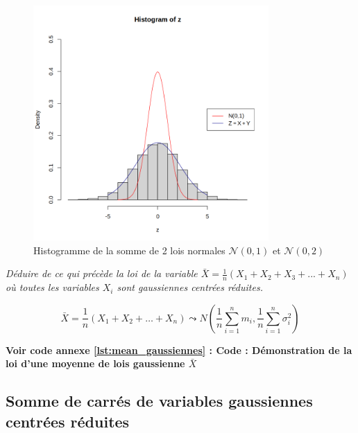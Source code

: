 \begin{table}[H]
\begin{minipage}{0.28\textwidth}
        \end{minipage}
        \hfill
        \begin{minipage}{0.28\textwidth}
            \centering
            \begin{figure}[H]
                \centering
                \includegraphics[width=0.80\textwidth]{4_attachments/figures/output33.png}
                \caption{Histogramme de la somme de 2 lois normales $\mathcal N(0,1)$ et $\mathcal N(0,2)$}
                \label{fig:fig3}
            \end{figure}
            
        \end{minipage}
      \end{table}
      \begin{center}
        \textit{Déduire de ce qui précède la loi de la variable $\bar{X}=\frac{1}{n}(X_1+X_2+X_3+...+X_n)$ où toutes les variables $X_i$ sont gaussiennes centrées réduites.}
        \end{center}
        \begin{equation}
            \bar{X} = \frac{1}{n}(X_1 + X_2 + \dots + X_n) \leadsto N\left( \frac{1}{n} \sum_{i=1}^{n} m_i, \frac{1}{n} \sum_{i=1}^{n} \sigma_i^2 \right)
            \label{eq:moyennegaussiennes}
        \end{equation}

    \noindent \textbf{Voir code annexe \ref{lst:mean_gaussiennes} : Code : Démonstration de la loi d'une moyenne de lois gaussienne $\bar{X}$}


    \subsection{Somme de carrés de variables gaussiennes centrées réduites}

